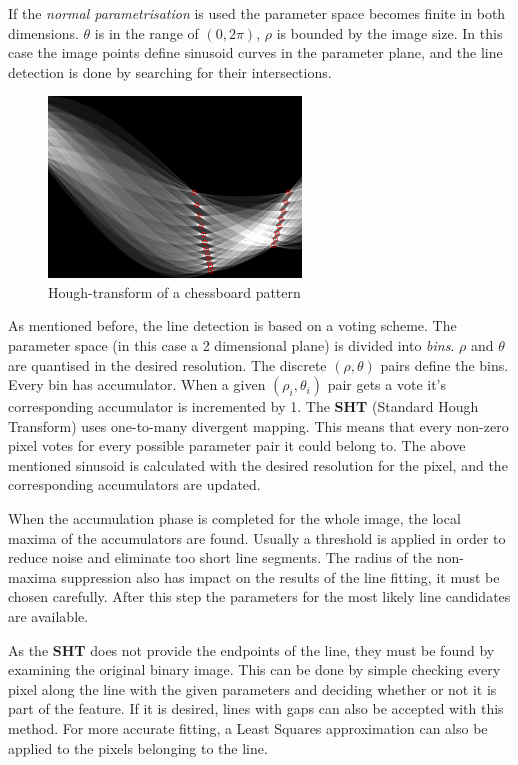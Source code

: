 If the \emph{normal parametrisation} is used the parameter space becomes finite in both dimensions.
$\theta$ is in the range of $(0,2\pi)$, $\rho$ is bounded by the image size.
In this case the image points define sinusoid curves in the parameter plane, and the line detection is done by searching for their intersections.
\begin{figure}[ht]
	\centering
	\includegraphics[width=0.6\textwidth]{figures/Perspective_chessboard_hough_transform.png}
	\caption{Hough-transform of a chessboard pattern}
	\label{fig:houghChessBoard}
\end{figure}

As mentioned before, the line detection is based on a voting scheme.
The parameter space (in this case a 2 dimensional plane) is divided into \emph{bins}.
$\rho$ and $\theta$ are quantised in the desired resolution.
The discrete $(\rho,\theta)$ pairs define the bins.
Every bin has accumulator.
When a given $(\rho_i,\theta_i)$ pair gets a vote it's corresponding accumulator is incremented by 1.
The \textbf{SHT} (Standard Hough Transform) uses one-to-many divergent mapping.
This means that every non-zero pixel votes for every possible parameter pair it could belong to.
The above mentioned sinusoid is calculated with the desired resolution for the pixel, and the corresponding accumulators are updated.

When the accumulation phase is completed for the whole image, the local maxima of the accumulators are found.
Usually a threshold is applied in order to reduce noise and eliminate too short line segments.
The radius of the non-maxima suppression also has impact on the results of the line fitting, it must be chosen carefully.
After this step the parameters for the most likely line candidates are available.

As the \textbf{SHT} does not provide the endpoints of the line, they must be found by examining the original binary image.
This can be done by simple checking every pixel along the line with the given parameters and deciding whether or not it is part of the feature.
If it is desired, lines with gaps can also be accepted with this method.
For more accurate fitting, a Least Squares approximation can also be applied to the pixels belonging to the line.

